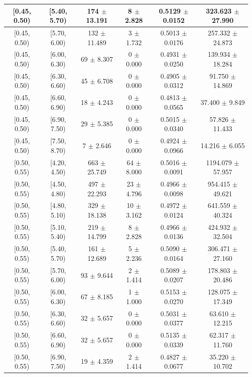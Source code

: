 \begin{longtable}{|c|c|c|c|c|c|}
\hline
[0.45, 0.50) & [5.40, 5.70) & 174 $\pm$ 13.191 & 8 $\pm$ 2.828 & 0.5129 $\pm$ 0.0152 & 323.623 $\pm$ 27.990 \\ 
\hline
[0.45, 0.50) & [5.70, 6.00) & 132 $\pm$ 11.489 & 3 $\pm$ 1.732 & 0.5013 $\pm$ 0.0176 & 257.332 $\pm$ 24.873 \\ 
\hline
[0.45, 0.50) & [6.00, 6.30) & 69 $\pm$ 8.307 & 0 $\pm$ 0.000 & 0.4931 $\pm$ 0.0250 & 139.934 $\pm$ 18.284 \\ 
\hline
[0.45, 0.50) & [6.30, 6.60) & 45 $\pm$ 6.708 & 0 $\pm$ 0.000 & 0.4905 $\pm$ 0.0312 & 91.750 $\pm$ 14.869 \\ 
\hline
[0.45, 0.50) & [6.60, 6.90) & 18 $\pm$ 4.243 & 0 $\pm$ 0.000 & 0.4813 $\pm$ 0.0565 & 37.400 $\pm$ 9.849 \\ 
\hline
[0.45, 0.50) & [6.90, 7.50) & 29 $\pm$ 5.385 & 0 $\pm$ 0.000 & 0.5015 $\pm$ 0.0340 & 57.826 $\pm$ 11.433 \\ 
\hline
[0.45, 0.50) & [7.50, 8.70) & 7 $\pm$ 2.646 & 0 $\pm$ 0.000 & 0.4924 $\pm$ 0.0966 & 14.216 $\pm$ 6.055 \\ 
\hline
[0.50, 0.55) & [4.20, 4.50) & 663 $\pm$ 25.749 & 64 $\pm$ 8.000 & 0.5016 $\pm$ 0.0091 & 1194.079 $\pm$ 57.957 \\ 
\hline
[0.50, 0.55) & [4.50, 4.80) & 497 $\pm$ 22.293 & 23 $\pm$ 4.796 & 0.4966 $\pm$ 0.0098 & 954.415 $\pm$ 49.621 \\ 
\hline
[0.50, 0.55) & [4.80, 5.10) & 329 $\pm$ 18.138 & 10 $\pm$ 3.162 & 0.4972 $\pm$ 0.0124 & 641.559 $\pm$ 40.324 \\ 
\hline
[0.50, 0.55) & [5.10, 5.40) & 219 $\pm$ 14.799 & 8 $\pm$ 2.828 & 0.4966 $\pm$ 0.0136 & 424.932 $\pm$ 32.504 \\ 
\hline
[0.50, 0.55) & [5.40, 5.70) & 161 $\pm$ 12.689 & 5 $\pm$ 2.236 & 0.5090 $\pm$ 0.0164 & 306.471 $\pm$ 27.160 \\ 
\hline
[0.50, 0.55) & [5.70, 6.00) & 93 $\pm$ 9.644 & 2 $\pm$ 1.414 & 0.5089 $\pm$ 0.0207 & 178.803 $\pm$ 20.486 \\ 
\hline
[0.50, 0.55) & [6.00, 6.30) & 67 $\pm$ 8.185 & 1 $\pm$ 1.000 & 0.5153 $\pm$ 0.0270 & 128.075 $\pm$ 17.349 \\ 
\hline
[0.50, 0.55) & [6.30, 6.60) & 32 $\pm$ 5.657 & 0 $\pm$ 0.000 & 0.5031 $\pm$ 0.0377 & 63.610 $\pm$ 12.215 \\ 
\hline
[0.50, 0.55) & [6.60, 6.90) & 32 $\pm$ 5.657 & 0 $\pm$ 0.000 & 0.5135 $\pm$ 0.0339 & 62.317 $\pm$ 11.760 \\ 
\hline
[0.50, 0.55) & [6.90, 7.50) & 19 $\pm$ 4.359 & 2 $\pm$ 1.414 & 0.4827 $\pm$ 0.0677 & 35.220 $\pm$ 10.702 \\ 

\end{longtable}

